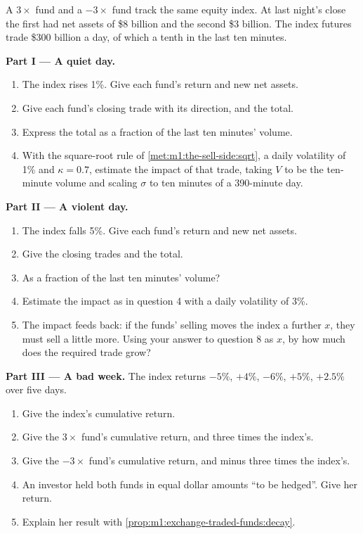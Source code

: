 \begin{problem}\label{pb:m1:exchange-traded-funds:1}
A $3\times$ fund and a $-3\times$ fund track the same equity index. At last
night's close the first had net assets of \$8 billion and the second \$3
billion. The index futures trade \$300 billion a day, of which a tenth in the
last ten minutes.

\medskip\noindent\textbf{Part I --- A quiet day.}
\begin{enumerate}
\item The index rises 1\%. Give each fund's return and new net assets.
\item Give each fund's closing trade with its direction, and the total.
\item Express the total as a fraction of the last ten minutes' volume.
\item With the square-root rule of \cref{met:m1:the-sell-side:sqrt}, a daily
volatility of 1\% and $\kappa = 0.7$, estimate the impact of that trade,
taking $V$ to be the ten-minute volume and scaling $\sigma$ to ten minutes of
a 390-minute day.
\end{enumerate}

\medskip\noindent\textbf{Part II --- A violent day.}
\begin{enumerate}[resume]
\item The index falls 5\%. Give each fund's return and new net assets.
\item Give the closing trades and the total.
\item As a fraction of the last ten minutes' volume?
\item Estimate the impact as in question 4 with a daily volatility of 3\%.
\item The impact feeds back: if the funds' selling moves the index a further
$x$, they must sell a little more. Using your answer to question 8 as $x$,
by how much does the required trade grow?
\end{enumerate}

\medskip\noindent\textbf{Part III --- A bad week.}
The index returns $-5\%$, $+4\%$, $-6\%$, $+5\%$, $+2.5\%$ over five days.
\begin{enumerate}[resume]
\item Give the index's cumulative return.
\item Give the $3\times$ fund's cumulative return, and three times the
index's.
\item Give the $-3\times$ fund's cumulative return, and minus three times the
index's.
\item An investor held both funds in equal dollar amounts ``to be hedged''.
Give her return.
\item Explain her result with \cref{prop:m1:exchange-traded-funds:decay}.
\end{enumerate}


\end{problem}
